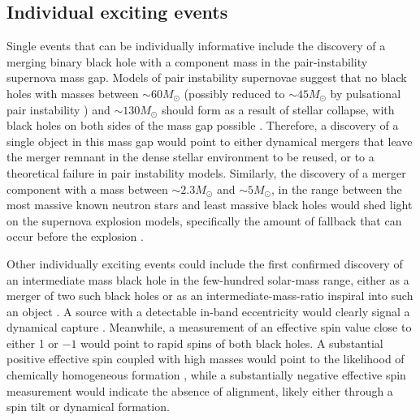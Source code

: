 \documentclass[iop,onecolumn]{revtex4}
\begin{document}
\subsection{Individual exciting events}
Single events that can be individually informative include the discovery of a merging binary black hole with a component mass in the pair-instability supernova mass gap.  Models of pair instability supernovae suggest that no black holes with masses between $\sim 60 M_\odot$ (possibly reduced to $\sim 45 M_\odot$ by pulsational pair instability \citep{Woosley:2017}) and $\sim 130 M_\odot$ should form as a result of stellar collapse, with black holes on both sides of the mass gap possible \citep{Marchant:2016}.  Therefore, a discovery of a single object in this mass gap would point to either dynamical mergers that leave the merger remnant in the dense stellar environment to be reused, or to a theoretical failure in pair instability models.  Similarly, the discovery of a merger component with a mass between $\sim 2.3 M_\odot$ and $\sim 5 M_\odot$, in the range between the most massive known neutron stars and least massive black holes \citep{Ozel:2010,Farr:2011} would shed light on the supernova explosion models, specifically the amount of fallback that can occur before the explosion \citep{Fryer:2012}.

Other individually exciting events could include the first confirmed discovery of an intermediate mass black hole in the few-hundred solar-mass range, either as a merger of two such black holes \citep[e.g.,][]{Veitch:2015,Graff:2015} or as an intermediate-mass-ratio inspiral into such an object \citep[e.g.,][]{Haster:2015IMRI,Haster:2016}.  A source with a detectable in-band eccentricity would clearly signal a dynamical capture \citep{Breivik:2016}.  Meanwhile, a measurement of an effective spin value close to either 1 or $-1$ would point to rapid spins of both black holes.  A substantial positive effective spin coupled with high masses would point to the likelihood of chemically homogeneous formation \citep{Marchant:2016}, while a substantially negative effective spin measurement would indicate the absence of alignment, likely either through a spin tilt or dynamical formation.  
\end{document}
